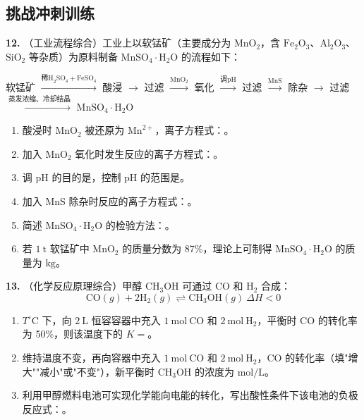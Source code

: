 \subsection{挑战冲刺训练}

\textbf{12.} （工业流程综合）工业上以软锰矿（主要成分为 $\text{MnO}_2$，含 $\text{Fe}_2\text{O}_3$、$\text{Al}_2\text{O}_3$、$\text{SiO}_2$ 等杂质）为原料制备 $\text{MnSO}_4\cdot\text{H}_2\text{O}$ 的流程如下：

软锰矿 $\xrightarrow{\text{稀H}_2\text{SO}_4 + \text{FeSO}_4}$ 酸浸 $\to$ 过滤 $\xrightarrow{\text{MnO}_2}$ 氧化 $\xrightarrow{\text{调pH}}$ 过滤 $\xrightarrow{\text{MnS}}$ 除杂 $\to$ 过滤 $\xrightarrow{\text{蒸发浓缩、冷却结晶}}$ $\text{MnSO}_4\cdot\text{H}_2\text{O}$

\begin{enumerate}
  \item 酸浸时 $\text{MnO}_2$ 被还原为 $\text{Mn}^{2+}$，离子方程式：\underline{\qquad\qquad}。
  \item 加入 $\text{MnO}_2$ 氧化时发生反应的离子方程式：\underline{\qquad\qquad}。
  \item 调 pH 的目的是\underline{\qquad\qquad}，控制 pH 的范围是\underline{\qquad\qquad}。
  \item 加入 $\text{MnS}$ 除杂时反应的离子方程式：\underline{\qquad\qquad}。
  \item 简述 $\text{MnSO}_4\cdot\text{H}_2\text{O}$ 的检验方法：\underline{\qquad\qquad}。
  \item 若 $1\ \text{t}$ 软锰矿中 $\text{MnO}_2$ 的质量分数为 87\%，理论上可制得 $\text{MnSO}_4\cdot\text{H}_2\text{O}$ 的质量为\underline{\qquad\qquad} $\text{kg}$。
\end{enumerate}

\textbf{13.} （化学反应原理综合）甲醇 $\text{CH}_3\text{OH}$ 可通过 $\text{CO}$ 和 $\text{H}_2$ 合成：
\[
\text{CO}(g) + 2\text{H}_2(g) \rightleftharpoons \text{CH}_3\text{OH}(g)\ \Delta H < 0
\]

\begin{enumerate}
  \item $T^\circ\text{C}$ 下，向 $2\ \text{L}$ 恒容容器中充入 $1\ \text{mol}\ \text{CO}$ 和 $2\ \text{mol}\ \text{H}_2$，平衡时 $\text{CO}$ 的转化率为 50\%，则该温度下的 $K =$\underline{\qquad\qquad}。
  \item 维持温度不变，再向容器中充入 $1\ \text{mol}\ \text{CO}$ 和 $2\ \text{mol}\ \text{H}_2$，$\text{CO}$ 的转化率\underline{\qquad\qquad}（填"增大""减小"或"不变"），新平衡时 $\text{CH}_3\text{OH}$ 的浓度为\underline{\qquad\qquad} $\text{mol/L}$。
  \item 利用甲醇燃料电池可实现化学能向电能的转化，写出酸性条件下该电池的负极反应式：\underline{\qquad\qquad}。
\end{enumerate}

